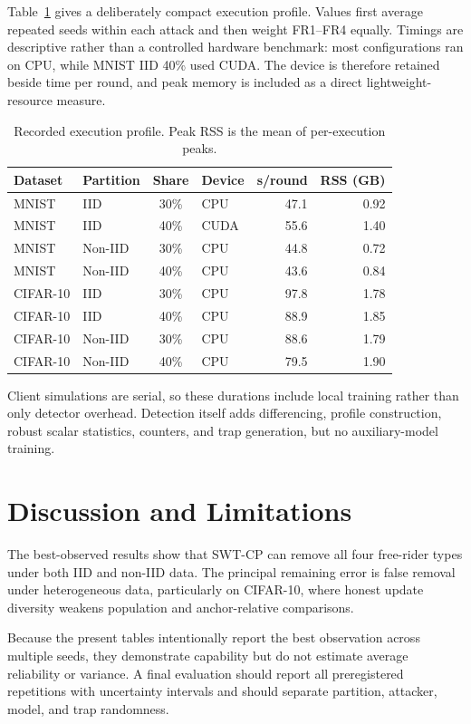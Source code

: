 \documentclass[conference]{IEEEtran}
\begin{document}
Table~\ref{tab:cost} gives a deliberately compact execution profile. Values first average repeated seeds within each attack and then weight FR1--FR4 equally. Timings are descriptive rather than a controlled hardware benchmark: most configurations ran on CPU, while MNIST IID 40\% used CUDA. The device is therefore retained beside time per round, and peak memory is included as a direct lightweight-resource measure.

\begin{table}[t]
\centering
\caption{Recorded execution profile. Peak RSS is the mean of per-execution peaks.}
\label{tab:cost}
\footnotesize
\setlength{\tabcolsep}{2.5pt}
\begin{tabular}{llclrr}
\toprule
Dataset & Partition & Share & Device & s/round & RSS (GB) \\
\midrule
MNIST & IID     & 30\% & CPU  & 47.1 & 0.92 \\
MNIST & IID     & 40\% & CUDA & 55.6 & 1.40 \\
MNIST & Non-IID & 30\% & CPU  & 44.8 & 0.72 \\
MNIST & Non-IID & 40\% & CPU  & 43.6 & 0.84 \\
CIFAR-10 & IID     & 30\% & CPU & 97.8 & 1.78 \\
CIFAR-10 & IID     & 40\% & CPU & 88.9 & 1.85 \\
CIFAR-10 & Non-IID & 30\% & CPU & 88.6 & 1.79 \\
CIFAR-10 & Non-IID & 40\% & CPU & 79.5 & 1.90 \\
\bottomrule
\end{tabular}
\end{table}

Client simulations are serial, so these durations include local training rather than only detector overhead. Detection itself adds differencing, profile construction, robust scalar statistics, counters, and trap generation, but no auxiliary-model training.

\section{Discussion and Limitations}
The best-observed results show that SWT-CP can remove all four free-rider types under both IID and non-IID data. The principal remaining error is false removal under heterogeneous data, particularly on CIFAR-10, where honest update diversity weakens population and anchor-relative comparisons.

Because the present tables intentionally report the best observation across multiple seeds, they demonstrate capability but do not estimate average reliability or variance. A final evaluation should report all preregistered repetitions with uncertainty intervals and should separate partition, attacker, model, and trap randomness.
\end{document}

